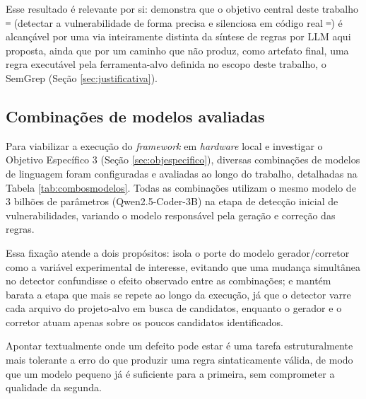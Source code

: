 \documentclass[
    12pt,                %
    openright,           %
    oneside,             %
    a4paper,             %
    english,             %
    brazil               %
]{abntex2}
\newcommand{\antigo}[1]{\sout{#1}}
\newcommand{\novo}[1]{{\color{red}#1}}
\begin{document}
\par
Esse resultado é relevante por si: demonstra que o objetivo central deste trabalho\antigo{ --}\novo{ (}detectar a vulnerabilidade de forma precisa e silenciosa em código real\antigo{ --}\novo{)} é alcançável por uma via inteiramente distinta da síntese de regras por LLM aqui proposta, ainda que por um caminho que não produz, como artefato final, uma regra executável pela ferramenta-alvo definida no escopo deste trabalho, o SemGrep (Seção \ref{sec:justificativa}).

\subsection{Combinações de modelos avaliadas}
\label{sec:combosmodelos}
\par
Para viabilizar a execução do \textit{framework} em \textit{hardware} local e investigar o Objetivo Específico 3 (Seção \ref{sec:objespecifico}), diversas combinações de modelos de linguagem foram configuradas e avaliadas ao longo do trabalho, detalhadas na Tabela \ref{tab:combosmodelos}.
Todas as combinações utilizam o mesmo modelo de 3 bilhões de parâmetros (Qwen2.5-Coder-3B) na etapa de detecção inicial de vulnerabilidades, variando o modelo responsável pela geração e correção das regras.
\par
Essa fixação atende a dois propósitos: isola o porte do modelo gerador/corretor como a variável experimental de interesse, evitando que uma mudança simultânea no detector confundisse o efeito observado entre as combinações; e mantém barata a etapa que mais se repete ao longo da execução, já que o detector varre cada arquivo do projeto-alvo em busca de candidatos, enquanto o gerador e o corretor atuam apenas sobre os poucos candidatos identificados. 
\par
Apontar textualmente onde um defeito pode estar é uma tarefa estruturalmente mais tolerante a erro do que produzir uma regra sintaticamente válida, de modo que um modelo pequeno já é suficiente para a primeira, sem comprometer a qualidade da segunda.
\end{document}
